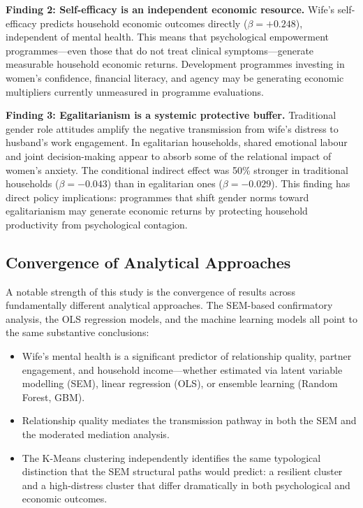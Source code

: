 \documentclass[12pt, a4paper]{article}
\begin{document}
\textbf{Finding 2: Self-efficacy is an independent economic resource.} Wife's self-efficacy predicts household economic outcomes directly ($\beta = +0.248$), independent of mental health. This means that psychological empowerment programmes—even those that do not treat clinical symptoms—generate measurable household economic returns. Development programmes investing in women's confidence, financial literacy, and agency may be generating economic multipliers currently unmeasured in programme evaluations.

\textbf{Finding 3: Egalitarianism is a systemic protective buffer.} Traditional gender role attitudes amplify the negative transmission from wife's distress to husband's work engagement. In egalitarian households, shared emotional labour and joint decision-making appear to absorb some of the relational impact of women's anxiety. The conditional indirect effect was 50\% stronger in traditional households ($\beta = -0.043$) than in egalitarian ones ($\beta = -0.029$). This finding has direct policy implications: programmes that shift gender norms toward egalitarianism may generate economic returns by protecting household productivity from psychological contagion.

\subsection{Convergence of Analytical Approaches}

A notable strength of this study is the convergence of results across fundamentally different analytical approaches. The SEM-based confirmatory analysis, the OLS regression models, and the machine learning models all point to the same substantive conclusions:

\begin{itemize}[leftmargin=2em]
  \item Wife's mental health is a significant predictor of relationship quality, partner engagement, and household income—whether estimated via latent variable modelling (SEM), linear regression (OLS), or ensemble learning (Random Forest, GBM).
  \item Relationship quality mediates the transmission pathway in both the SEM and the moderated mediation analysis.
  \item The K-Means clustering independently identifies the same typological distinction that the SEM structural paths would predict: a resilient cluster and a high-distress cluster that differ dramatically in both psychological and economic outcomes.
\end{itemize}
\end{document}
